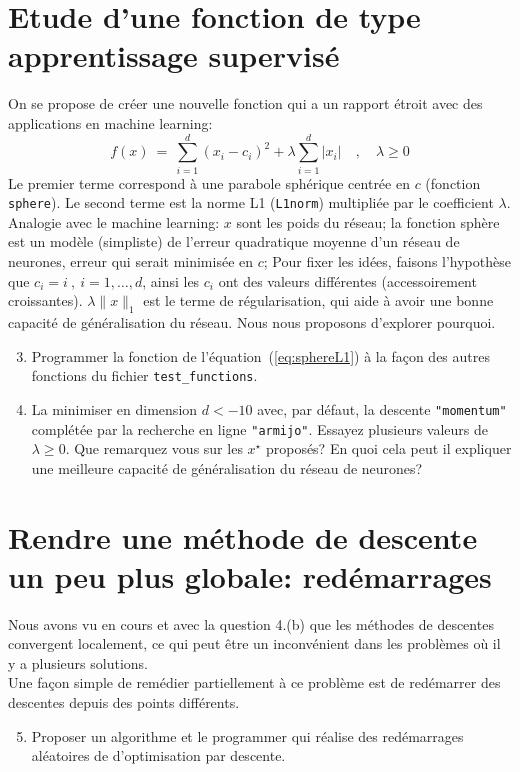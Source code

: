 \documentclass[12pt]{article}
\begin{document}
\section{Etude d'une fonction de type apprentissage supervisé}
On se propose de créer une nouvelle fonction qui a un rapport étroit avec des applications en machine learning:
\begin{equation}
f(x) ~=~ \sum_{i=1}^d (x_i-c_i)^2 + \lambda \sum_{i=1}^d \lvert x_i \rvert \quad,\quad \lambda \ge 0
\label{eq:sphereL1}
\end{equation}
Le premier terme correspond à une parabole sphérique centrée en $c$ (fonction \texttt{sphere}). 
Le second terme est la norme L1 (\texttt{L1norm}) multipliée par le coefficient $\lambda$.\\
Analogie avec le machine learning: $x$ sont les poids du réseau; 
la fonction sphère est un modèle (simpliste) de l'erreur quadratique moyenne d'un réseau de neurones, erreur qui serait minimisée en $c$; 
Pour fixer les idées, faisons l'hypothèse que $c_i = i~,~i=1,\ldots,d$, ainsi les $c_i$ ont des valeurs différentes (accessoirement croissantes).
$\lambda \lVert x \rVert_1$ est le terme de régularisation, qui aide à avoir une bonne capacité de généralisation du réseau. 
Nous nous proposons d'explorer pourquoi.
\begin{enumerate}
\setcounter{enumi}{2}
\item Programmer la fonction de l'équation~(\ref{eq:sphereL1}) à la façon des autres fonctions du fichier \texttt{test_functions}.
\item La minimiser en dimension $d<-10$ avec, par défaut, la descente \texttt{"momentum"} complétée par la recherche en ligne \texttt{"armijo"}. 
Essayez plusieurs valeurs de $\lambda \ge 0$.
Que remarquez vous sur les $x^\star$ proposés? En quoi cela peut il expliquer une meilleure capacité de généralisation du réseau de neurones?
\end{enumerate}


\section{Rendre une méthode de descente un peu plus globale: redémarrages}
Nous avons vu en cours et avec la question 4.(b) que les méthodes de descentes convergent localement, ce qui peut être
un inconvénient dans les problèmes où il y a plusieurs solutions.\\
Une façon simple de remédier partiellement à ce problème est de redémarrer des descentes depuis des points différents.
\begin{enumerate}
\setcounter{enumi}{4}
\item Proposer un algorithme et le programmer qui réalise des redémarrages aléatoires de d'optimisation par descente.
\end{enumerate}
\end{document}
